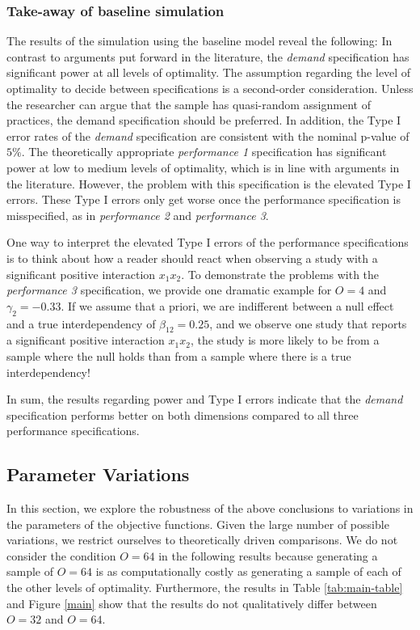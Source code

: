 \documentclass[12pt]{article}
\begin{document}
\subsubsection{Take-away of baseline simulation}\label{Take-away of baseline simulation}
The results of the simulation using the baseline model reveal the following: In contrast to arguments put forward in the literature, the \emph{demand} specification has significant power at all levels of optimality. The assumption regarding the level of optimality to decide between specifications is a second-order consideration. Unless the researcher can argue that the sample has quasi-random assignment of practices, the demand specification should be preferred. In addition, the Type I error rates of the \emph{demand} specification are consistent with the nominal p-value of $5\%$. The theoretically appropriate \emph{performance 1} specification has significant power at low to medium levels of optimality, which is in line with arguments in the literature. However, the problem with this specification is the elevated Type I errors. These Type I errors only get worse once the performance specification is misspecified, as in \emph{performance 2} and \emph{performance 3}.

One way to interpret the elevated Type I errors of the performance specifications is to think about how a reader should react when observing a study with a significant positive interaction \(x_1 x_2\). To demonstrate the problems with the \emph{performance 3} specification, we provide one dramatic example for \(O = 4\) and \(\gamma_2 = -0.33\). If we assume that a priori, we are indifferent between a null effect and a true interdependency of \(\beta_{12} = 0.25\), and we observe one study that reports a significant positive interaction \(x_{1} x_{2}\), the study is more likely to be from a sample where the null holds than from a sample where there is a true interdependency!

In sum, the results regarding power and Type I errors indicate that the \emph{demand} specification performs better on both dimensions compared to all three performance specifications.

\subsection{Parameter Variations}\label{parameter-variations}

In this section, we explore the robustness of the above conclusions to variations in the parameters of the objective functions. Given the large number of possible variations, we restrict ourselves to theoretically driven comparisons. We do not consider the condition $O = 64$ in the following results because generating a sample of $O = 64$ is as computationally costly as generating a sample of each of the other levels of optimality. Furthermore, the results in Table \ref{tab:main-table} and Figure \ref{main} show that the results do not qualitatively differ between $O = 32$ and $O = 64$.
\end{document}
